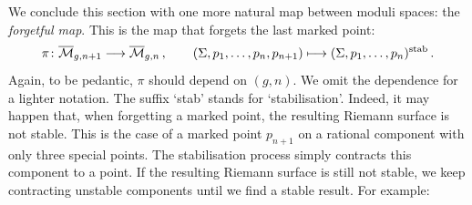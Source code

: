 \documentclass[11pt,reqno]{amsart}
\numberwithin{equation}{section}
\newcommand{\mc}[1]{\mathcal{#1}}
\newcommand{\M}{\mc{M}}
\newcommand{\Mbar}{\overline{\M}}
\theoremstyle{plain}
\theoremstyle{definition}
\begin{document}
We conclude this section with one more natural map between moduli spaces: the \emph{forgetful map}. This is the map that forgets the last marked point:
\begin{equation}
  \pi \colon \Mbar_{g,n+1} \longrightarrow \Mbar_{g,n} \,,
  \qquad
  (\Sigma,p_1,\dots,p_n,p_{n+1}) \longmapsto (\Sigma,p_1,\dots,p_n)^{\textup{stab}} \,.
\end{equation}
Again, to be pedantic, $\pi$ should depend on $(g,n)$. We omit the dependence for a lighter notation.
The suffix `stab' stands for `stabilisation'. Indeed, it may happen that, when forgetting a marked point, the resulting Riemann surface is not stable. This is the case of a marked point $p_{n+1}$ on a rational component with only three special points. The stabilisation process simply contracts this component to a point. If the resulting Riemann surface is still not stable, we keep contracting unstable components until we find a stable result. For example:
\end{document}
